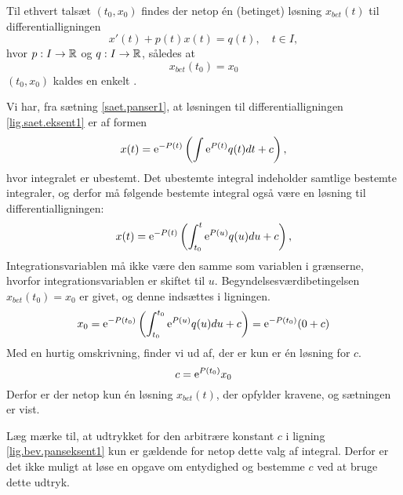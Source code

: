\begin{theorem} \label{saet.panseksent1}
Til ethvert talsæt $ (t_0,x_0) $ findes der netop én (betinget) løsning $ x_{bet}(t) $ til differentialligningen
\begin{equation}
x'(t) + p(t)x(t) = q(t), \quad t \in I, \label{lig.saet.eksent1}
\end{equation}
hvor $ p : I \rightarrow \mathbb{R} $ og $ q: I \rightarrow \mathbb{R} $, således at 
\begin{equation}
x_{bet}(t_0) = x_0
\end{equation}
$ (t_0,x_0) $ kaldes en enkelt .
\end{theorem}

\begin{bevis} \label{bev.panseksent1}
Vi har, fra sætning \ref{saet.panser1}, at løsningen til differentialligningen \eqref{lig.saet.eksent1} er af formen
\begin{equation}
x(t) = \mathrm{e} ^{-P(t)} \left( \int \mathrm{e} ^{P(t)}q(t)dt + c \right),
\end{equation}
hvor integralet er ubestemt. Det ubestemte integral indeholder samtlige bestemte integraler, og derfor må følgende bestemte integral også være en løsning til differentialligningen:
\begin{equation}
x(t) = \mathrm{e} ^{-P(t)} \left( \int_{t_0}^{t} \mathrm{e} ^{P(u)}q(u)du + c \right),
\end{equation}
Integrationsvariablen må ikke være den samme som variablen i grænserne, hvorfor integrationsvariablen er skiftet til $ u $. \bs Begyndelsesværdibetingelsen $ x_{bet}(t_0) = x_0 $ er givet, og denne indsættes i ligningen.
\begin{equation}
x_0 = \mathrm{e} ^{-P(t_0)} \left( \int_{t_0}^{t_0} \mathrm{e} ^{P(u)}q(u)du + c \right) = \mathrm{e} ^{-P(t_0)}(0 + c)
\end{equation}
Med en hurtig omskrivning, finder vi ud af, der er kun er én løsning for $ c $.
\begin{equation}
c = \mathrm{e}^{P(t_0)}x_0 \label{lig.bev.panseksent1}
\end{equation}
Derfor er der netop kun én løsning $ x_{bet}(t) $, der opfylder kravene, og sætningen er vist.

\begin{obs} 
Læg mærke til, at udtrykket for den arbitrære konstant $ c $ i ligning \eqref{lig.bev.panseksent1} kun er gældende for netop dette valg af integral. Derfor er det ikke muligt at løse en opgave om entydighed og bestemme $ c $ ved at bruge dette udtryk.
\end{obs}
\end{bevis}

